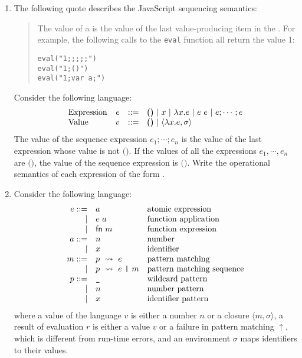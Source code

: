 \begin{enumerate}
\item The following quote describes the JavaScript sequencing semantics:

\begin{quote}
The value of a  is the value of the last
value-producing item in the .  For example, the
following calls to the \verb!eval! function all return the value 1:
\begin{verbatim}
eval("1;;;;;")
eval("1;()")
eval("1;var a;")
\end{verbatim}
\end{quote}
Consider the following language:
\[
  \begin{array}{lrrl}
    \text{Expression} & e & ::= & \textsf{()}\ |\ x\ |\ \efun{x}{e}\ |\ \eapp{e}{e}\ |\
    e;\cdots;e \\
    \text{Value} & v & ::= & \textsf{()}\ |\ \clov{x}{e}{\sigma} \\
  \end{array}
\]
The value of the sequence expression $e_1;\cdots;e_n$
is the value of the last expression whose value is not $\textsf{()}$.
If the values of all the expressions $e_1,\cdots,e_n$ are $\textsf{()}$,
the value of the sequence expression is $\textsf{()}$.
Write the operational semantics of each expression of the form
.

\item Consider the following language:
\[
\begin{array}{rll}
e ::= & a& \text{atomic expression}\\
\mid& e\ a& \text{function application}\\
\mid& \textsf{fn}\ m& \text{function expression}\\
a ::= & n & \text{number}\\
\mid&x & \text{identifier}\\
m ::= & p\ \leadsto\ e & \text{pattern matching}\\
\mid& p\ \leadsto\ e\ \verb!|!\ m & \text{pattern matching sequence}\\
p ::= & \verb!_! & \text{wildcard pattern}\\
\mid&n& \text{number pattern}\\
\mid&x& \text{identifier pattern}
\end{array}
\]
where a value of the language $v$ is either a number $n$ or a closure $\langle m, \sigma\rangle$,
a result of evaluation $r$ is either a value $v$ or a failure in pattern matching $\uparrow$,
which is different from run-time errors,
and an environment $\sigma$ maps identifiers to their values.


\end{enumerate}

